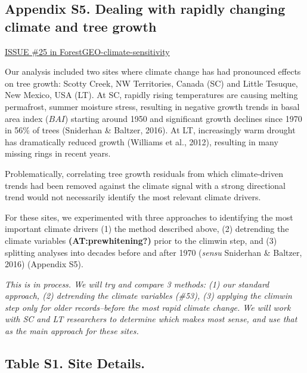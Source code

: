 \documentclass[
]{article}
\begin{document}
\newpage

\hypertarget{appendix-s5.-dealing-with-rapidly-changing-climate-and-tree-growth}{%
\subsection{Appendix S5. Dealing with rapidly changing climate and tree
growth}\label{appendix-s5.-dealing-with-rapidly-changing-climate-and-tree-growth}}

\href{https://github.com/EcoClimLab/ForestGEO-climate-sensitivity/issues/25}{ISSUE
\#25 in ForestGEO-climate-sensitivity}

Our analysis included two sites where climate change has had pronounced
effects on tree growth: Scotty Creek, NW Territories, Canada (SC) and
Little Tesuque, New Mexico, USA (LT). At SC, rapidly rising temperatures
are causing melting permafrost, summer moisture stress, resulting in
negative growth trends in basal area index (\(BAI\)) starting around
1950 and significant growth declines since 1970 in 56\% of trees
(Sniderhan \& Baltzer, 2016). At LT, increasingly warm drought has
dramatically reduced growth (Williams et al., 2012), resulting in many
missing rings in recent years.

Problematically, correlating tree growth residuals from which
climate-driven trends had been removed against the climate signal with a
strong directional trend would not necessarily identify the most
relevant climate drivers.

For these sites, we experimented with three approaches to identifying
the most important climate drivers (1) the method described above, (2)
detrending the climate variables \textbf{(AT:prewhitening?)} prior to
the climwin step, and (3) splitting analyses into decades before and
after 1970 (\emph{sensu} Sniderhan \& Baltzer, 2016) (Appendix S5).

\emph{This is in process. We will try and compare 3 methods: (1) our
standard approach, (2) detrending the climate variables (\#53), (3)
applying the climwin step only for older records--before the most rapid
climate change. We will work with SC and LT researchers to determine
which makes most sense, and use that as the main approach for these
sites.}

\newpage

\hypertarget{table-s1.-site-details.}{%
\subsection{Table S1. Site Details.}\label{table-s1.-site-details.}}
\end{document}
